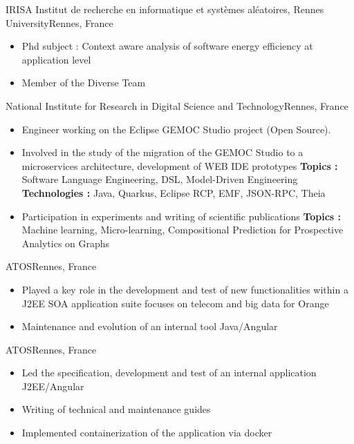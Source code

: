 {IRISA Institut de recherche en informatique et systèmes aléatoires, Rennes University}{Rennes, France}
{
\begin{itemize}
    \item Phd subject : Context aware analysis of software energy efficiency at application level
    \item Member of the Diverse Team
\end{itemize}
 }
{National Institute for Research in Digital Science and Technology}{Rennes, France}
{\begin{itemize}
\item Engineer working on the Eclipse GEMOC Studio project (Open Source). 
\item {Involved in the study of the migration of the GEMOC Studio to a microservices architecture, development of WEB IDE prototypes \newline \textbf{Topics :} Software Language Engineering, DSL, Model-Driven Engineering
\newline \textbf{Technologies :} Java, Quarkus, Eclipse RCP, EMF, JSON-RPC, Theia}
\item Participation in experiments and writing of scientific publications
\newline\textbf{Topics :} Machine learning, Micro-learning, Compositional Prediction for Prospective Analytics on Graphs
\end{itemize}}
{ATOS}{Rennes, France}
{
\begin{itemize}
\item Played a key role in the development and test of new functionalities within a J2EE SOA application suite focuses on telecom and big data for Orange
\item Maintenance and evolution of an internal tool Java/Angular
\end{itemize}
}
{ATOS}{Rennes, France}
{\begin{itemize}
\item Led the specification, development and test of an internal application J2EE/Angular
\item Writing of technical and maintenance guides
\item Implemented containerization of the application via docker
\end{itemize}}